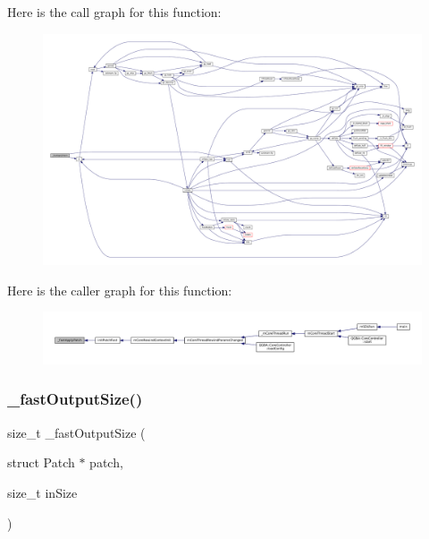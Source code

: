 Here is the call graph for this function\+:
\nopagebreak
\begin{figure}[H]
\begin{center}
\leavevmode
\includegraphics[width=350pt]{patch-fast_8c_ab67102e77abbaa460f97daeef660dc16_cgraph}
\end{center}
\end{figure}
Here is the caller graph for this function\+:
\nopagebreak
\begin{figure}[H]
\begin{center}
\leavevmode
\includegraphics[width=350pt]{patch-fast_8c_ab67102e77abbaa460f97daeef660dc16_icgraph}
\end{center}
\end{figure}
\mbox{\label{patch-fast_8c_a52ac89ce08d7d452245d71aa0d305d6e}} 
\subsubsection{\texorpdfstring{\+\_\+fast\+Output\+Size()}{\_fastOutputSize()}}
{\footnotesize\ttfamily size\+\_\+t \+\_\+fast\+Output\+Size (\begin{DoxyParamCaption}\item[{struct Patch $\ast$}]{patch,  }\item[{size\+\_\+t}]{in\+Size }\end{DoxyParamCaption})}


